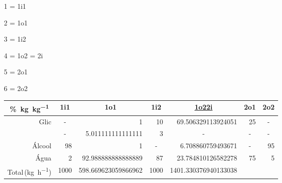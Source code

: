 \documentclass[12pt]{article}
\begin{document}
\begin{center}

\begin{itemize}
\begin{multicols}{3}

	\item 1 = 1i1
	\item 2 = 1o1
	\item 3 = 1i2
	\item 4 = 1o2 = 2i
	\item 5 = 2o1
	\item 6 = 2o2

\end{multicols}
\end{itemize}

\vspace{5mm}

\begin{tabular}{r *{6}{r} }

	\multicolumn{1}{c}{\unit{\percent.\kg\per\kg}}
	& \multicolumn{1}{c}{1i1}
	& \multicolumn{1}{c}{1o1}
	& \multicolumn{1}{c}{1i2}
	& \multicolumn{1}{c}{\underline{1o2\quad 2i}}
	& \multicolumn{1}{c}{2o1}
	& \multicolumn{1}{c}{2o2}

	\\ \midrule
	
	Glic
	& \multicolumn{1}{c}{-}
	& 1
	& 10
	& \num{69.506329113924051}
	& 25
	& \multicolumn{1}{c}{-}
	
	\\
	
	\ch{NaCl}
	& \multicolumn{1}{c}{-}
	& \num[round-precision=0]{5.011111111111111}
	& 3
	& \multicolumn{1}{c}{-}
	& \multicolumn{1}{c}{-}
	& \multicolumn{1}{c}{-}
	
	\\
	
	Álcool
	& 98
	& 1
	& \multicolumn{1}{c}{-}
	& \num{6.708860759493671}
	& \multicolumn{1}{c}{-}
	& 95
	
	\\
	
	Água
	& 2
	& \num[round-precision=0]{92.988888888888889}
	& 87
	& \num{23.784810126582278}
	& 75
	& 5
	
	\\ \midrule
	
	Total\,(\unit{\kg\per\hour})
	& 1000
	& \num[round-precision=1]{598.669623059866962}
	& 1000
	& \num[round-precision=1]{1401.330376940133038}
	&
	&

\end{tabular}

\end{center}
\end{document}
